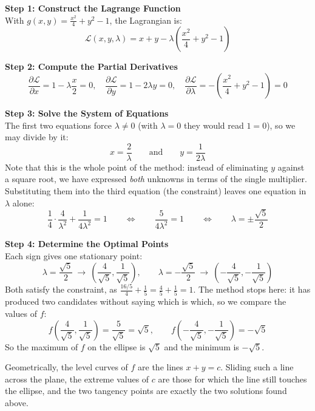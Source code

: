 \documentclass[]{article}
\begin{document}
	\textbf{Step 1: Construct the Lagrange Function}\\
	With $g(x, y) = \frac{x^2}{4} + y^2 - 1$, the Lagrangian is:
	$$
	\mathcal{L}(x, y, \lambda) = x + y - \lambda \left( \frac{x^2}{4} + y^2 - 1 \right)
	$$

	\textbf{Step 2: Compute the Partial Derivatives}\\
	$$
	\frac{\partial \mathcal{L}}{\partial x} = 1 - \lambda \frac{x}{2} = 0,
	\quad
	\frac{\partial \mathcal{L}}{\partial y} = 1 - 2 \lambda y = 0,
	\quad
	\frac{\partial \mathcal{L}}{\partial \lambda} = -\left( \frac{x^2}{4} + y^2 - 1 \right) = 0
	$$

	\textbf{Step 3: Solve the System of Equations}\\
	The first two equations force $\lambda \neq 0$ (with $\lambda = 0$ they would read $1 = 0$), so we may divide by it:
	$$
	x = \frac{2}{\lambda}
	\qquad \text{and} \qquad
	y = \frac{1}{2\lambda}
	$$
	Note that this is the whole point of the method: instead of eliminating $y$ against a square root, we have expressed \textit{both} unknowns in terms of the single multiplier.
	Substituting them into the third equation (the constraint) leaves one equation in $\lambda$ alone:
	$$
	\frac{1}{4} \cdot \frac{4}{\lambda^2} + \frac{1}{4 \lambda^2} = 1
	\qquad \Longleftrightarrow \qquad
	\frac{5}{4 \lambda^2} = 1
	\qquad \Longleftrightarrow \qquad
	\lambda = \pm \frac{\sqrt{5}}{2}
	$$

	\textbf{Step 4: Determine the Optimal Points}\\
	Each sign gives one stationary point:
	$$
	\lambda = \frac{\sqrt{5}}{2}
	\ \longrightarrow \
	\left( \frac{4}{\sqrt{5}}, \frac{1}{\sqrt{5}} \right),
	\qquad
	\lambda = -\frac{\sqrt{5}}{2}
	\ \longrightarrow \
	\left( -\frac{4}{\sqrt{5}}, -\frac{1}{\sqrt{5}} \right)
	$$
	Both satisfy the constraint, as $\frac{16/5}{4} + \frac{1}{5} = \frac{4}{5} + \frac{1}{5} = 1$.
	The method stops here: it has produced two candidates without saying which is which, so we compare the values of $f$:
	$$
	f\left( \frac{4}{\sqrt{5}}, \frac{1}{\sqrt{5}} \right) = \frac{5}{\sqrt{5}} = \sqrt{5},
	\qquad
	f\left( -\frac{4}{\sqrt{5}}, -\frac{1}{\sqrt{5}} \right) = -\sqrt{5}
	$$
	So the maximum of $f$ on the ellipse is $\sqrt{5}$ and the minimum is $-\sqrt{5}$.

	Geometrically, the level curves of $f$ are the lines $x + y = c$.
	Sliding such a line across the plane, the extreme values of $c$ are those for which the line still touches the ellipse, and the two tangency points are exactly the two solutions found above.
\end{document}
